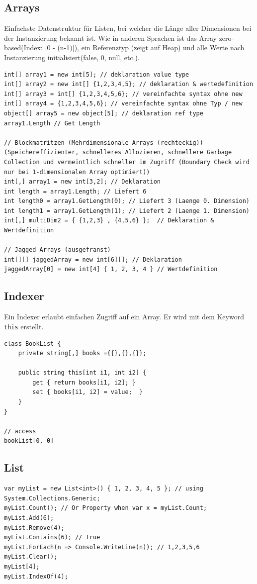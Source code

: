 \documentclass[
a4paper,
oneside,
10pt,
fleqn,
headsepline,
toc=listofnumbered, 
bibliography=totocnumbered]{scrartcl}
\begin{document}
\clearpage

\subsection{Arrays}
Einfachste Datenstruktur für Listen, bei welcher die Länge aller Dimensionen bei der Instanzierung bekannt ist. Wie in anderen Sprachen ist das Array zero-based(Index: [0 - (n-1)]), ein Referenztyp (zeigt auf Heap) und alle Werte nach Instanzierung initialisiert(false, 0, null, etc.).
\begin{lstlisting}
int[] array1 = new int[5]; // deklaration value type
int[] array2 = new int[] {1,2,3,4,5}; // deklaration & wertedefinition
int[] array3 = int[] {1,2,3,4,5,6}; // vereinfachte syntax ohne new
int[] array4 = {1,2,3,4,5,6}; // vereinfachte syntax ohne Typ / new
object[] array5 = new object[5]; // deklaration ref type
array1.Length // Get Length

// Blockmatritzen (Mehrdimensionale Arrays (rechteckig))  (Speichereffizienter, schnelleres Allozieren, schnellere Garbage Collection und vermeintlich schneller im Zugriff (Boundary Check wird nur bei 1-dimensionalen Array optimiert))
int[,] array1 = new int[3,2]; // Deklaration
int length = array1.Length; // Liefert 6
int length0 = array1.GetLength(0); // Liefert 3 (Laenge 0. Dimension)
int length1 = array1.GetLength(1); // Liefert 2 (Laenge 1. Dimension) 
int[,] multiDim2 = { {1,2,3} , {4,5,6} };  // Deklaration & Wertdefinition 

// Jagged Arrays (ausgefranst)
int[][] jaggedArray = new int[6][]; // Deklaration 
jaggedArray[0] = new int[4] { 1, 2, 3, 4 } // Wertdefinition 
\end{lstlisting}

\subsection{Indexer}
Ein Indexer erlaubt einfachen Zugriff auf ein Array. Er wird mit dem Keyword \lstinline|this| erstellt.
\begin{lstlisting}
class BookList {
	private string[,] books ={{},{},{}};

	public string this[int i1, int i2] {
		get { return books[i1, i2]; }
		set { books[i1, i2] = value;  } 
	}
}

// access
bookList[0, 0]
\end{lstlisting}

\subsection{List}
\begin{lstlisting}
var myList = new List<int>() { 1, 2, 3, 4, 5 }; // using System.Collections.Generic;
myList.Count(); // Or Property when var x = myList.Count;
myList.Add(6);
myList.Remove(4);
myList.Contains(6); // True
myList.ForEach(n => Console.WriteLine(n)); // 1,2,3,5,6
myList.Clear();
myList[4];
myList.IndexOf(4);
\end{lstlisting}
\end{document}
